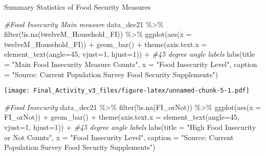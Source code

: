 \documentclass[
]{article}
\newenvironment{Shaded}{\begin{snugshade}}{\end{snugshade}}
\newcommand{\AttributeTok}[1]{\textcolor[rgb]{0.77,0.63,0.00}{#1}}
\newcommand{\CommentTok}[1]{\textcolor[rgb]{0.56,0.35,0.01}{\textit{#1}}}
\newcommand{\DecValTok}[1]{\textcolor[rgb]{0.00,0.00,0.81}{#1}}
\newcommand{\FunctionTok}[1]{\textcolor[rgb]{0.00,0.00,0.00}{#1}}
\newcommand{\NormalTok}[1]{#1}
\newcommand{\SpecialCharTok}[1]{\textcolor[rgb]{0.00,0.00,0.00}{#1}}
\newcommand{\StringTok}[1]{\textcolor[rgb]{0.31,0.60,0.02}{#1}}
\begin{document}
Summary Statistics of Food Security Measures

\begin{Shaded}
\begin{Highlighting}[]
\CommentTok{\#Food Insecurity Main measure}
\NormalTok{data\_dec21 }\SpecialCharTok{\%\textgreater{}\%}  \FunctionTok{filter}\NormalTok{(}\SpecialCharTok{!}\FunctionTok{is.na}\NormalTok{(twelveM\_Household\_FI)) }\SpecialCharTok{\%\textgreater{}\%} \FunctionTok{ggplot}\NormalTok{(}\FunctionTok{aes}\NormalTok{(}\AttributeTok{x =}\NormalTok{ twelveM\_Household\_FI)) }\SpecialCharTok{+}
  \FunctionTok{geom\_bar}\NormalTok{() }\SpecialCharTok{+}
  \FunctionTok{theme}\NormalTok{(}\AttributeTok{axis.text.x =} \FunctionTok{element\_text}\NormalTok{(}\AttributeTok{angle=}\DecValTok{45}\NormalTok{, }\AttributeTok{vjust=}\DecValTok{1}\NormalTok{, }\AttributeTok{hjust=}\DecValTok{1}\NormalTok{)) }\SpecialCharTok{+} \CommentTok{\#45 degree angle labels}
  \FunctionTok{labs}\NormalTok{(}\AttributeTok{title =} \StringTok{"Main Food Insecurity Measure Counts"}\NormalTok{, }\AttributeTok{x =} \StringTok{"Food Insecurity Level"}\NormalTok{, }\AttributeTok{caption =} \StringTok{"Source: Current Population Survey Food Security Supplements"}\NormalTok{)}
\end{Highlighting}
\end{Shaded}

\texttt{[image: Final\_Activity\_v3\_files/figure-latex/unnamed-chunk-5-1.pdf]}

\begin{Shaded}
\begin{Highlighting}[]
\CommentTok{\#Food Insecurity}
\NormalTok{data\_dec21 }\SpecialCharTok{\%\textgreater{}\%}  \FunctionTok{filter}\NormalTok{(}\SpecialCharTok{!}\FunctionTok{is.na}\NormalTok{(FI\_orNot)) }\SpecialCharTok{\%\textgreater{}\%} \FunctionTok{ggplot}\NormalTok{(}\FunctionTok{aes}\NormalTok{(}\AttributeTok{x =}\NormalTok{ FI\_orNot)) }\SpecialCharTok{+}
  \FunctionTok{geom\_bar}\NormalTok{() }\SpecialCharTok{+}
  \FunctionTok{theme}\NormalTok{(}\AttributeTok{axis.text.x =} \FunctionTok{element\_text}\NormalTok{(}\AttributeTok{angle=}\DecValTok{45}\NormalTok{, }\AttributeTok{vjust=}\DecValTok{1}\NormalTok{, }\AttributeTok{hjust=}\DecValTok{1}\NormalTok{)) }\SpecialCharTok{+} \CommentTok{\#45 degree angle labels}
  \FunctionTok{labs}\NormalTok{(}\AttributeTok{title =} \StringTok{"High Food Insecurity or Not Counts"}\NormalTok{, }\AttributeTok{x =} \StringTok{"Food Insecurity Level"}\NormalTok{, }\AttributeTok{caption =} \StringTok{"Source: Current Population Survey Food Security Supplements"}\NormalTok{)}
\end{Highlighting}
\end{Shaded}
\end{document}
